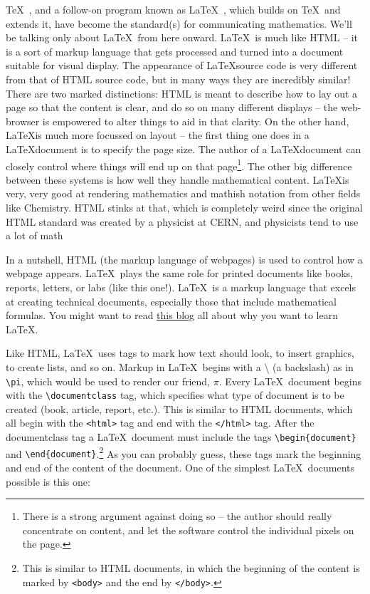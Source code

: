 \TeX\ , and a follow-on program known as \LaTeX\ , which builds on \TeX\  and extends it, have become the standard(s) for communicating mathematics.  We'll be talking only about \LaTeX\ from here onward.  \LaTeX\ is much like HTML -- it is a sort of markup language that gets processed and turned into a document suitable for visual display.  The appearance of \LaTeX source code is very different from that of HTML source code, but in many ways they are incredibly similar!  There are two marked distinctions:  HTML is meant to describe how to lay out a page so that the content is clear, and do so on many different displays -- the web-browser is empowered to alter things to aid in that clarity. On the other hand, \LaTeX is much more focussed on layout -- the first thing one does in a \LaTeX document is to specify the page size.  The author of a \LaTeX document can closely control where things will end up on that page\footnote{There is a strong argument against doing so -- the author should really concentrate on content, and let the software control the individual pixels on the page.}.
The other big difference between these systems is how well they handle mathematical content.  \LaTeX is very, very good at rendering mathematics and mathish notation from other fields like Chemistry.  HTML stinks at that, which is completely weird since the original HTML standard was created by a physicist at CERN, and physicists tend to use a lot of math\textellipsis

In a nutshell, HTML (the markup language of webpages) is used to
control how a webpage appears. \LaTeX\  plays the same role for printed
documents like books, reports, letters, or labs (like this one!).
\LaTeX\  is a markup language that excels at creating technical documents,
especially those that include mathematical formulas. You might want
to read \href{https://medium.com/swlh/the-students-guide-to-latex-markup-what-it-is-and-why-you-want-it-651e723ce0c8}{this blog}
all about why you want to learn \LaTeX.

Like HTML, \LaTeX\  uses tags to mark how text should look, to insert
graphics, to create lists, and so on. Markup in \LaTeX\  begins with
a \textbackslash{} (a backslash) as in {\tt \textbackslash pi},
which would be used to render our friend, $\pi$. Every \LaTeX\ 
document begins with the {\tt \textbackslash documentclass} tag,
which specifies what type of document is to be created (book, article,
report, etc.).  This is similar to HTML documents, which all begin with the \verb+<html>+
tag and end with the \verb+</html>+ tag. After the documentclass tag a \LaTeX\  document must include the
tags {\tt \textbackslash begin\{document\}} and {\tt \textbackslash end\{document\}}.\footnote{This is similar to HTML documents, in which the beginning of the content
is marked by {\tt <body>} and the end by {\tt </body>}.} As you can probably guess, these tags mark the beginning and end
of the content of the document. One of the simplest \LaTeX\  documents
possible is this one:

